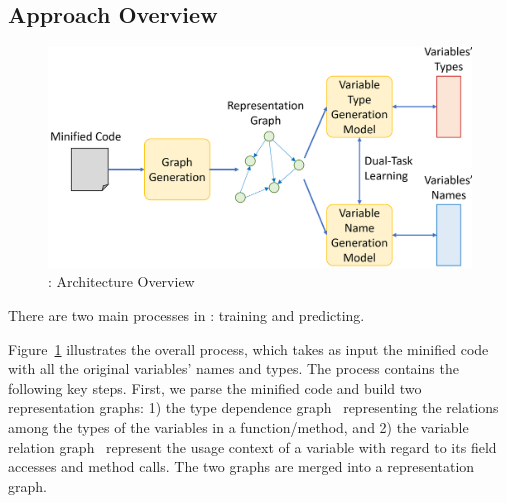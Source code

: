\subsection{Approach Overview}


\begin{figure}[t]
	\begin{center}
	  \includegraphics[width=\columnwidth]{figures/overview.png}
          \vspace{-15pt}
		\caption{{\tool}: Architecture Overview}
		\label{overview}
	\end{center}
\end{figure}


There are two main processes in {\tool}: training and predicting.

Figure~\ref{overview} illustrates the overall process, which takes as
input the minified code with all the original variables' names and
types. The process contains the following key steps. First, we parse
the minified code and build two representation graphs: 1) the type
dependence graph~\cite{type-graph-icse22} representing the relations
among the types of the variables in a function/method, and 2) the
variable relation graph~\cite{icse19} represent the usage context of a
variable with regard to its field accesses and method calls. The two
graphs are merged into a representation graph.

